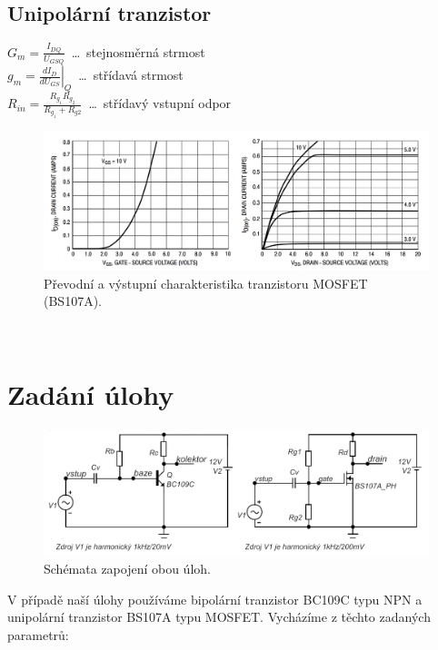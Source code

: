 \documentclass{protokol}
\begin{document}
		
	\subsection{Unipolární tranzistor}
		$ G_m=\frac{I_{D Q}}{U_{G S Q}} $~\dots~stejnosměrná strmost\\
		$ g_m=\left.\frac{d I_D}{d U_{G S}}\right|_Q $~\dots~střídavá strmost\\
		$ R_{i n}=\frac{R_{g_1} R_{g_2}}{R_{g_1}+R_{g 2}} $~\dots~střídavý vstupní odpor
		\begin{figure}[h!]
			\centering
			\includegraphics[width=\textwidth]{bs107a.png}
			\centering
			\caption{Převodní a výstupní charakteristika tranzistoru MOSFET (BS107A).}
			\label{fig:bs107a}
		\end{figure}\\
	
	
	
	\section{Zadání úlohy}
	\begin{figure}[h!]
		\centering
		\includegraphics[width=\textwidth]{schemata.png}
		\centering
		\caption{Schémata zapojení obou úloh.}
		\label{fig:bs107a}
	\end{figure}
		V případě naší úlohy používáme bipolární tranzistor BC109C typu NPN a unipolární tranzistor BS107A typu MOSFET. Vycházíme z těchto zadaných parametrů:
		
\end{document}
